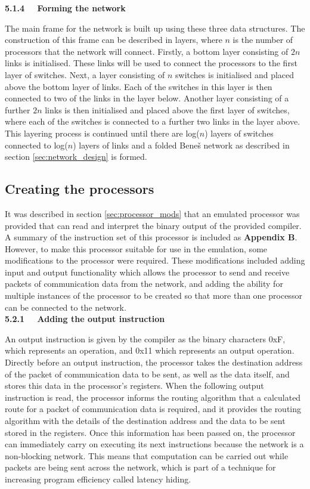 \documentclass[a4paper, 12pt]{article}
\begin{document}
\noindent\textbf{5.1.4 \ \ Forming the network}

\noindent The main frame for the network is built up using these three data structures. The construction of this frame can be described in layers, where $n$ is the number of processors that the network will connect. Firstly, a bottom layer consisting of $2n$ links is initialised. These links will be used to connect the processors to the first layer of switches. Next, a layer consisting of $n$ switches is initialised and placed above the bottom layer of links. Each of the switches in this layer is then connected to two of the links in the layer below. Another layer consisting of a further $2n$ links is then initialised and placed above the first layer of switches, where each of the switches is connected to a further two links in the layer above. This layering process is continued until there are log($n$) layers of switches connected to log($n$) layers of links and a folded Bene\v{s} network as described in section \ref{sec:network_design} is formed.

\subsection{Creating the processors}

It was described in section \ref{sec:processor_mods} that an emulated processor was provided that can read and interpret the binary output of the provided compiler. A summary of the instruction set of this processor is included as \textbf{Appendix B}. However, to make this processor suitable for use in the emulation, some modifications to the processor were required. These modifications included adding input and output functionality which allows the processor to send and receive packets of communication data from the network, and adding the ability for multiple instances of the processor to be created so that more than one processor can be connected to the network.\\

\noindent\textbf{5.2.1 \ \ Adding the output instruction}

\noindent An output instruction is given by the compiler as the binary characters 0xF, which represents an operation, and 0x11 which represents an output operation. Directly before an output instruction, the processor takes the destination address of the packet of communication data to be sent, as well as the data itself, and stores this data in the processor's registers. When the following output instruction is read, the processor informs the routing algorithm that a calculated route for a packet of communication data is required, and it provides the routing algorithm with the details of the destination address and the data to be sent stored in the registers. Once this information has been passed on, the processor can immediately carry on executing its next instructions because the network is a non-blocking network. This means that computation can be carried out while packets are being sent across the network, which is part of a technique for increasing program efficiency called latency hiding.\\
\end{document}
